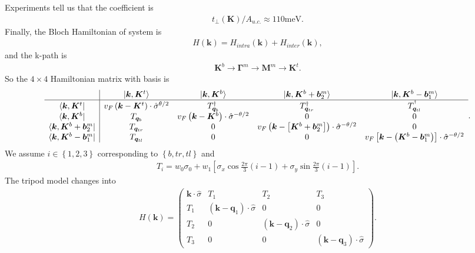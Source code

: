 \documentclass[10pt, oneside]{article}
\newcommand{\te}{\theta}
\newcommand{\p}[1]{\left(#1\right)}
\newcommand{\bb}[1]{\left[#1\right]}
\newcommand{\br}[1]{\left\{#1\right\}}
\begin{document}
Experiments tell us that the coefficient is
\begin{align}
	t_\perp\p{\bm{K}}/A_{u.c.}\approx110\text{meV}.
\end{align}
Finally, the Bloch Hamiltonian of system is 
\begin{align}
	H\p{\bm{k}} = H_{intra}\p{\bm{k}} + H_{inter}\p{\bm{k}},
\end{align}
and the k-path is 
\begin{align}
	\bm{K}^{b}\rightarrow \bm{\Gamma}^{m} \rightarrow \bm{M}^{m} \rightarrow \bm{K}^{t}.
\end{align}
So the \(4 \times 4\) Hamiltonian matrix with basis is 
\begin{align}
	\begin{array}{c |cccc}
		& \ket{\bm{k}, \bm{K}^{t}} & \ket{\bm{k}, \bm{K}^{b}} & \ket{\bm{k}, \bm{K}^{b} + \bm{b}^{m}_{2}} & \ket{\bm{k} , \bm{K}^{b}- \bm{b}^{m}_{1}} \\
		 \hline \bra{\bm{k}, \bm{K}^{t}} & v_{F} \p{\bm{k} - \bm{K}^{t}} \cdot \hat{\sigma}^{\te/2} & T^{\dagger}_{\bm{q}_{b}} & T^{\dagger}_{\bm{q}_{tr}} & T^{^{\dagger}}_{\bm{q}_{tl}} \\
		 \bra{\bm{k}, \bm{K}^{b}} & T_{\bm{q}_{b}} & v_{F} \p{\bm{k} - \bm{K}^{b}} \cdot \hat{\sigma}^{-\te/2} & 0 & 0 \\
		 \bra{\bm{k} , \bm{K}^{b}+ \bm{b}^{m}_{2}} & T_{\bm{q}_{tr}} & 0 & v_{F} \p{\bm{k}  - \bb{\bm{K}^{b}+ \bm{b}^{m}_{2}}} \cdot \hat{\sigma}^{-\te/2} & 0 \\
		 \bra{\bm{k}, \bm{K}^{b} - \bm{b}^{m}_{1}} & T_{\bm{q}_{tl}} & 0 & 0 & v_{F} \bb{\bm{k}  - \p{\bm{K}^{b}- \bm{b}^{m}_{1}}} \cdot \hat{\sigma}^{-\te/2}
	\end{array}.
\end{align}
We assume \(i \in \br{1,2,3}\) corresponding to \(\br{b, tr, tl}\)  and 
\begin{align}
	T_{i} = w_{0} \sigma_{0} + w_{1} \bb{\sigma_{x} \cos \frac{2\pi}{3} \p{i - 1} + \sigma_{y} \sin \frac{2\pi}{3} \p{i - 1}}.
\end{align}
The tripod model changes into 
\begin{align}
	H\p{\bm{k}} = \begin{pmatrix}
	\bm{k} \cdot \hat{\sigma} & T_{1} & T_{2} & T_{3} \\
	T_{1} & \p{\bm{k}-\bm{q}_{1}} \cdot \hat{\sigma} & 0 & 0 \\
	T_{2} & 0 & \p{\bm{k} - \bm{q}_{2}} \cdot \hat{\sigma} & 0 \\
	T_{3} & 0 & 0 & \p{\bm{k} - \bm{q}_{3}} \cdot \hat{\sigma}
	\end{pmatrix}.
\end{align}
\end{document}
